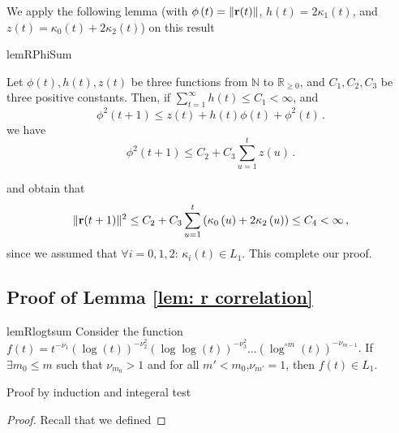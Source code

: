 \documentclass[twoside,11pt,english]{article}
\begin{document}
{We apply the following lemma (with $\phi\left(t\right)=\Vert\mathbf{r}(t)\Vert$,
$h\left(t\right)=2\kappa_{1}\left(t\right)$, and $z\left(t\right)=\kappa_{0}\left(t\right)+2\kappa_{2}\left(t\right)$)
on this result

\begin{restatable}{lemR}{PhiSum}

\label{lem: PhiSum}Let $\phi\left(t\right),h\left(t\right),z\left(t\right)$
be three functions from $\mathbb{N}$ to $\mathbb{R}_{\geq0}$, and
$C_{1},C_{2},C_{3}$ be three positive constants. Then, if $\sum_{t=1}^{\infty}h\left(t\right)\leq C_{1}<\infty$,
and 
\begin{equation}
\phi^{2}\left(t+1\right)\leq z\left(t\right)+h\left(t\right)\phi\left(t\right)+\phi^{2}\left(t\right)\,.\label{eq: rho bound}
\end{equation}
we have
\begin{equation}
\phi^{2}\left(t+1\right)\leq C_{2}+C_{3}\sum_{u=1}^{t}z\left(u\right)\,.\label{eq: rho sum bound}
\end{equation}

\end{restatable}

and obtain that 
\[
\Vert\mathbf{r}(t+1)\Vert^{2}\leq C_{2}+C_{3}\sum_{u=1}^{t}\left(\kappa_{0}\left(u\right)+2\kappa_{2}\left(u\right)\right)\leq C_{4}<\infty\,,
\]
since we assumed that $\forall i=0,1,2:\,\kappa_{i}\left(t\right)\in L_{1}$.
This complete our proof.

\subsection{Proof of Lemma \ref{lem: r correlation}}

\begin{restatable}{lemR}{logtsum}\label{lem:logtsum}
Consider the function $f(t)=t^{-\nu_1}(\log(t))^{-\nu_2^2}(\log\log(t))^{-\nu_3^2}\ldots(\log^{\circ m}(t))^{-\nu_{m-1}}$. If $\exists m_0\le m$ such that $\nu_{m_0}>1$ and for all $m'<m_0$,$\nu_{m'}=1$, then $f(t)\in L_1$. 
\end{restatable}
{\color{red} Proof by induction and integeral test}

\Correlation*
\begin{proof}
Recall that we defined


\end{proof}}
\end{document}
